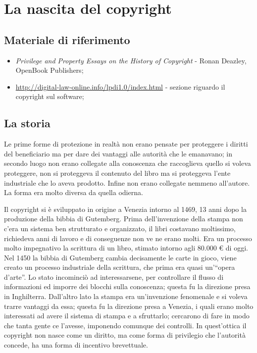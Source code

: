 \section{La nascita del copyright}

\subsection*{Materiale di riferimento}

\begin{itemize}

\item \textit{Privilege and Property Essays on the History of Copyright} - Ronan Deazley, OpenBook Publishers;
\item \url{http://digital-law-online.info/lpdi1.0/index.html} - sezione riguardo il copyright sul software;

\end{itemize}

\subsection{La storia}

Le prime forme di protezione in realtà non erano pensate per proteggere i diritti del beneficiario ma per dare dei vantaggi alle autorità che le emanavano; in secondo luogo non erano collegate alla conoscenza che raccoglieva quello si voleva proteggere, non si proteggeva il contenuto del libro ma si proteggeva l'ente industriale che lo aveva prodotto. Infine non erano collegate nemmeno all'autore. La forma era molto diversa da quella odierna.

Il copyright si è sviluppato in origine a Venezia intorno al 1469, 13 anni dopo la produzione della bibbia di Gutemberg. Prima dell'invenzione della stampa non c'era un sistema ben strutturato e organizzato, il libri costavano moltissimo, richiedeva anni di lavoro e di conseguenze non ve ne erano molti. Era un processo molto impegnativo la scrittura di un libro, stimato intorno agli 80.000 \euro{} di oggi. Nel 1450 la bibbia di Gutemberg cambia decisamente le carte in gioco, viene creato un processo industriale della scrittura, che prima era quasi un'``opera d'arte''. Lo stato incominciò ad interessarsene, per controllare il flusso di informazioni ed imporre dei blocchi sulla conoscenza; questa fu la direzione presa in Inghilterra. Dall'altro lato la stampa era un'invenzione fenomenale e si voleva trarre vantaggi da essa; questa fu la direzione presa a Venezia, i quali erano molto interessati ad avere il sistema di stampa e a sfruttarlo; cercarono di fare in modo che tanta gente ce l'avesse, imponendo comunque dei controlli. In quest'ottica il copyright non nasce come un diritto, ma come forma di privilegio che l'autorità concede, ha una forma di incentivo brevettuale.

